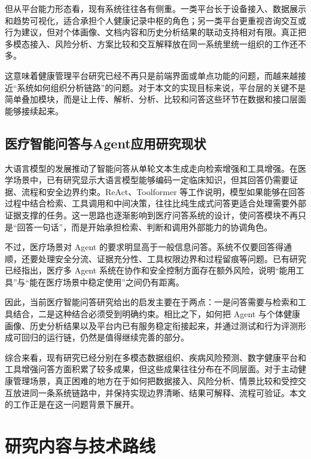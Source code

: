 但从平台能力形态看，现有系统往往各有侧重。一类平台长于设备接入、数据展示和趋势可视化，适合承担个人健康记录中枢的角色；另一类平台更重视咨询交互或行为建议，但对个体画像、文档内容和历史分析结果的联动支持相对有限。真正把多模态接入、风险分析、方案比较和交互解释放在同一系统里统一组织的工作还不多。

这意味着健康管理平台研究已经不再只是前端界面或单点功能的问题，而越来越接近“系统如何组织分析链路”的问题。对于本文的实现目标来说，平台层的关键不是简单叠加模块，而是让上传、解析、分析、比较和问答这些环节在数据和接口层面能够接续起来。

\subsection{医疗智能问答与Agent应用研究现状}

大语言模型的发展推动了智能问答从单轮文本生成走向检索增强和工具增强。在医学场景中，已有研究显示大语言模型能够编码一定临床知识，但其回答仍需要证据、流程和安全边界约束\cite{singhal2023clinicalllm}。ReAct、Toolformer 等工作说明，模型如果能够在回答过程中结合检索、工具调用和中间决策，往往比纯生成式问答更适合处理需要外部证据支撑的任务\cite{yao2023react,schick2023toolformer}。这一思路也逐渐影响到医疗问答系统的设计，使问答模块不再只是“回答一句话”，而是开始承担检索、判断和调用外部能力的协调角色。

不过，医疗场景对 Agent 的要求明显高于一般信息问答。系统不仅要回答得通顺，还要处理安全分流、证据充分性、工具权限边界和过程留痕等问题。已有研究已经指出，医疗多 Agent 系统在协作和安全控制方面存在额外风险，说明“能用工具”与“能在医疗场景中稳定使用”之间仍有距离\cite{chen2025medsentry}。

因此，当前医疗智能问答研究给出的启发主要在于两点：一是问答需要与检索和工具结合，二是这种结合必须受到明确约束。相比之下，如何把 Agent 与个体健康画像、历史分析结果以及平台内已有服务稳定衔接起来，并通过测试和行为评测形成可回归的运行链，仍然是值得继续完善的部分。

综合来看，现有研究已经分别在多模态数据组织、疾病风险预测、数字健康平台和工具增强问答方面积累了较多成果，但这些成果往往分布在不同层面。对于主动健康管理场景，真正困难的地方在于如何把数据接入、风险分析、情景比较和受控交互放进同一条系统链路中，并保持实现边界清晰、结果可解释、流程可验证。本文的工作正是在这一问题背景下展开。

\section{研究内容与技术路线}

